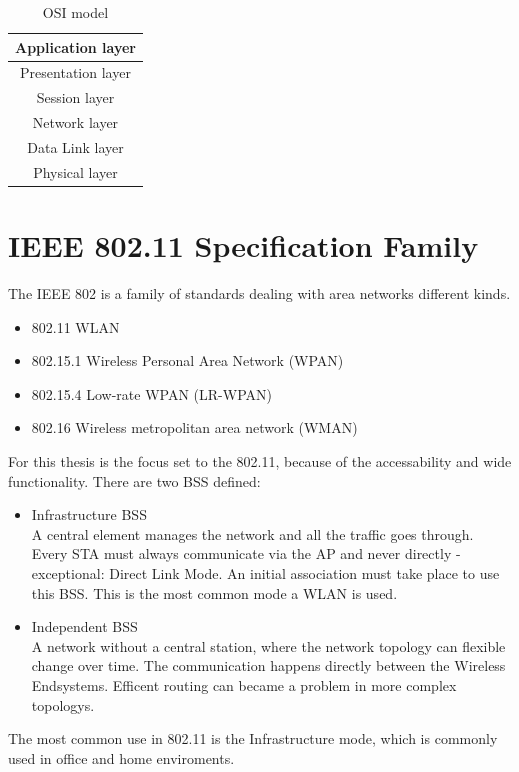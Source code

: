\documentclass[]{ccs-thesis}
\begin{document}
\begin{table}
	\centering
	\begin{tabular}{ |c| } 
		\hline
		Application layer\\
		\hline
		Presentation layer\\
		\hline
		Session layer\\
		\hline
		Network layer\\
		\hline
		\cellcolor{yellow!25}Data Link layer\\
		\hline
		\cellcolor{yellow!25}Physical layer\\
		\hline
	\end{tabular}
	\caption{\ac{OSI} model}
	\label{tab:OSI}
\end{table}

\section{IEEE 802.11 Specification Family}

The \ac{IEEE} 802 is a family of standards dealing with area networks different kinds.
\begin{itemize}
	\item 802.11 \ac{WLAN}
	\item 802.15.1 Wireless Personal Area Network (WPAN)
	\item 802.15.4 Low-rate WPAN (LR-WPAN)
	\item 802.16 Wireless metropolitan area network (WMAN)
\end{itemize}

For this thesis is the focus set to the 802.11, because of the accessability and wide functionality.
There are two \ac{BSS} defined:
\begin{itemize}
	\item Infrastructure BSS\\
	A central element manages the network and all the traffic goes through. 
	Every \ac{STA} must always communicate via the \ac{AP} and never directly - exceptional: Direct Link Mode.
	An initial association must take place to use this \ac{BSS}.
	This is the most common mode a \ac{WLAN} is used.
	\item Independent BSS\\
	A network without a central station, where the network topology can flexible change over time.
	The communication happens directly between the Wireless Endsystems.
	Efficent routing can became a problem in more complex topologys.
\end{itemize}
The most common use in 802.11 is the Infrastructure mode, which is commonly used in office and home enviroments.\\ 
\end{document}
